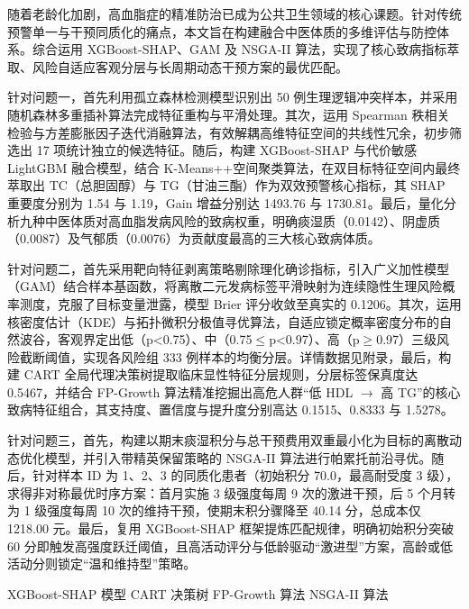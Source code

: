\documentclass[12pt]{article}
\begin{document}
	{\songti{}
		随着老龄化加剧，高血脂症的精准防治已成为公共卫生领域的核心课题。针对传统预警单一与干预同质化的痛点，本文旨在构建融合中医体质的多维评估与防控体系。综合运用 XGBoost-SHAP、GAM 及 NSGA-II 算法，实现了核心致病指标萃取、风险自适应客观分层与长周期动态干预方案的最优匹配。
		
		针对问题一，首先利用孤立森林检测模型识别出 50 例生理逻辑冲突样本，并采用随机森林多重插补算法完成特征重构与平滑处理。其次，运用 Spearman 秩相关检验与方差膨胀因子迭代消融算法，有效解耦高维特征空间的共线性冗余，初步筛选出 17 项统计独立的候选特征。随后，构建 XGBoost-SHAP 与代价敏感 LightGBM 融合模型，结合 K-Means++空间聚类算法，在双目标特征空间内最终萃取出 TC（总胆固醇）与 TG（甘油三酯）作为双效预警核心指标，其 SHAP 重要度分别为 1.54 与 1.19，Gain 增益分别达 1493.76 与 1730.81。最后，量化分析九种中医体质对高血脂发病风险的致病权重，明确痰湿质（0.0142）、阴虚质（0.0087）及气郁质（0.0076）为贡献度最高的三大核心致病体质。
		
		针对问题二，首先采用靶向特征剥离策略剔除理化确诊指标，引入广义加性模型（GAM）结合样本基函数，将离散二元发病标签平滑映射为连续隐性生理风险概率测度，克服了目标变量泄露，模型 Brier 评分收敛至真实的 0.1206。其次，运用核密度估计（KDE）与拓扑微积分极值寻优算法，自适应锁定概率密度分布的自然波谷，客观界定出低（p<0.75）、中（0.75$\le$p<0.97）、高（p$\ge$0.97）三级风险截断阈值，实现各风险组 333 例样本的均衡分层。详情数据见附录，最后，构建 CART 全局代理决策树提取临床显性特征分层规则，分层标签保真度达 0.5467，并结合 FP-Growth 算法精准挖掘出高危人群“低 HDL $\rightarrow$ 高 TG”的核心致病特征组合，其支持度、置信度与提升度分别高达 0.1515、0.8333 与 1.5278。
		
		针对问题三，首先，构建以期末痰湿积分与总干预费用双重最小化为目标的离散动态优化模型，并引入带精英保留策略的 NSGA-II 算法进行帕累托前沿寻优。随后，针对样本 ID 为 1、2、3 的同质化患者（初始积分 70.0，最高耐受度 3 级），求得非对称最优时序方案：首月实施 3 级强度每周 9 次的激进干预，后 5 个月转为 1 级强度每周 10 次的维持干预，使期末积分骤降至 40.14 分，总成本仅 1218.00 元。最后，复用 XGBoost-SHAP 框架提炼匹配规律，明确初始积分突破 60 分即触发高强度跃迁阈值，且高活动评分与低龄驱动“激进型”方案，高龄或低活动分则锁定“温和维持型”策略。
		\vspace{0.1em}
		
		 XGBoost-SHAP 模型 \quad CART 决策树 \quad FP-Growth 算法 \quad NSGA-II 算法
		\par}
	\newpage
	
	\setcounter{page}{2}
	
\end{document}
